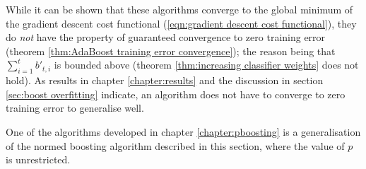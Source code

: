 While it can be shown that these algorithms converge to the global
minimum of the gradient descent cost functional (\ref{eqn:gradient
descent cost functional}), they do \emph{not} have the property of
guaranteed convergence to zero training error (theorem
\ref{thm:AdaBoost training error convergence}); the reason being that 
$\sum_{i=1}^t b'_{t,i}$ is bounded above (theorem \ref{thm:increasing
classifier weights} does not hold).  As results in chapter
\ref{chapter:results} and the discussion in section \ref{sec:boost
overfitting} indicate, an algorithm does not have to converge to zero
training error to generalise well.

One of the algorithms developed in chapter \ref{chapter:pboosting} is
a generalisation of the normed boosting algorithm described in this
section, where the value of $p$ is unrestricted.





